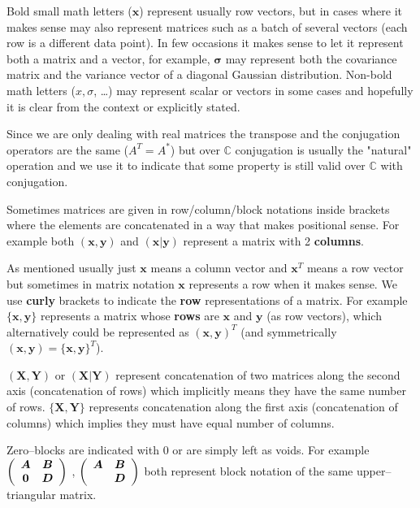 \documentclass[11pt, a4paper]{report}
\theoremstyle{plain}
\theoremstyle{definition}
\theoremstyle{remark}
\newcommand{\C}{\mathbb{C}}
\newcommand{\X}{\mathbf{X}}
\newcommand{\x}{\mathbf{x}}
\newcommand{\Y}{\mathbf{Y}}
\newcommand{\y}{\mathbf{y}}
\newcommand{\bv}[1]{\boldsymbol{#1}}
\begin{document}
Bold small math letters ($\bv{x}$) represent usually row vectors, but in cases
where it makes sense may also represent matrices such as a batch of several
vectors (each row is a different data point). In few occasions it makes sense to
let it represent both a matrix and a vector, for example, $\bv{\sigma}$ may
represent both the covariance matrix and the variance vector of a diagonal
Gaussian distribution. Non-bold math letters ($x, \sigma$, \dots) may represent
scalar or vectors in some cases and hopefully it is clear from the context or
explicitly stated.

Since we are only dealing with real matrices the transpose and the conjugation
operators are the same ($A^T = A^*$) but over $\C$ conjugation is
usually the "natural" operation and we use it to indicate that some property is
still valid over $\C$ with conjugation.

Sometimes matrices are given in row/column/block notations inside brackets where
the elements are concatenated in a way that makes positional sense.
For example
both $(\x,\y)$ and $(\x | \y)$ represent a matrix with 2 \textbf{columns}.

As mentioned usually just $\x$ means a column vector and $\x^T$ means a row
vector but sometimes in matrix notation $\x$ represents a row when it makes
sense.
We use \textbf{curly} brackets to indicate the \textbf{row} representations of a matrix.
For example $\{\x, \y\}$ represents a matrix whose \textbf{rows} are $\x$ and $\y$
(as row vectors), which alternatively could be represented as
$(\x, \y)^T$ (and symmetrically $(\x,\y) = \{\x,\y\}^T$).

$(\X,\Y)$ or $(\X | \Y)$ represent
concatenation of two matrices along the second axis (concatenation of rows) 
which implicitly means they have the same number
of rows. $\{\X, \Y\}$ represents concatenation along the first axis
(concatenation of columns) which implies they must have equal number of columns.

Zero--blocks are indicated with $0$ or are simply left as voids. For
example
$ \left( \begin{array}{c c} \bv{A} & \bv{B} \\ \bv{0} & \bv{D}
\end{array} \right) $ 
,
$ \left( \begin{array}{c c} \bv{A} & \bv{B} \\  & \bv{D}
\end{array} \right) $ 
both represent block notation of the same upper--triangular matrix.
\end{document}
